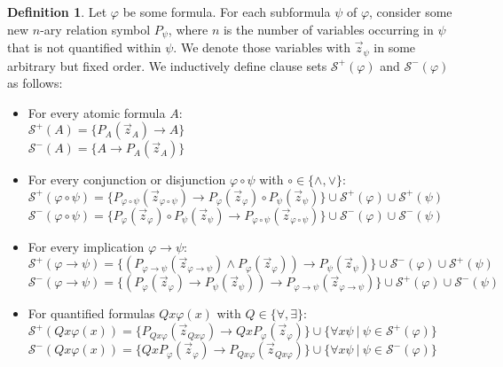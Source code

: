\documentclass[a4paper,12pt]{report}
\theoremstyle{definition}
\theoremstyle{definition}
\theoremstyle{definition}
\theoremstyle{definition}
\theoremstyle{definition}
\newtheorem{definition}[theorem]{Definition}
\theoremstyle{definition}
\theoremstyle{definition}
\begin{document}
	\begin{definition}
		Let $\varphi$ be some formula. For each subformula $\psi$ of $\varphi$, consider some new $n$-ary relation symbol $P_\psi$, where $n$ is the number of variables occurring in $\psi$ that is not quantified within $\psi$. We denote those variables with $\vec z_\psi$ in some arbitrary but fixed order. We inductively define clause sets $\mathcal S^+(\varphi)$ and $\mathcal S^-(\varphi)$ as follows:
		\begin{itemize}
			\item For every atomic formula $A$:\\
			$\mathcal S^+(A) = \{P_A(\vec z_A)\to A\}$\\$\mathcal S^-(A) = \{A\to P_A(\vec z_A)\}$
			\item For every conjunction or disjunction $\varphi\circ\psi$ with $\circ\in\{\wedge,\vee\}$:\\
			$\mathcal S^+(\varphi\circ\psi) = \{P_{\varphi\circ\psi}(\vec z_{\varphi\circ\psi})\to P_{\varphi}(\vec z_\varphi)\circ P_{\psi}(\vec z_\psi)\}\cup \mathcal S^+(\varphi)\cup \mathcal S^+(\psi)$\\$\mathcal S^-(\varphi\circ\psi) =\{P_{\varphi}(\vec z_\varphi)\circ P_{\psi}(\vec z_\psi)\to P_{\varphi\circ\psi}(\vec z_{\varphi\circ\psi})\}\cup \mathcal S^-(\varphi)\cup \mathcal S^-(\psi)$
			\item For every implication $\varphi \to\psi$:\\
			$\mathcal S^+(\varphi\to\psi) = \{(P_{\varphi\to\psi}(\vec z_{\varphi\to\psi})\wedge P_{\varphi}(\vec z_\varphi))\to P_{\psi}(\vec z_\psi)\}\cup \mathcal S^-(\varphi)\cup \mathcal S^+(\psi)$\\$\mathcal S^-(\varphi\to\psi)  = \{(P_{\varphi}(\vec z_\varphi)\to P_{\psi}(\vec z_\psi))\to P_{\varphi\to\psi}(\vec z_{\varphi\to\psi})\}\cup \mathcal S^+(\varphi)\cup \mathcal S^-(\psi)$
			\item For quantified formulas $Qx\varphi(x)$ with $Q\in \{\forall,\exists\}$:\\
			$\mathcal S^+(Qx\varphi(x)) = \{P_{Qx\varphi}(\vec z_{Qx\varphi})\to QxP_{\varphi}(\vec z_{\varphi})\}\cup \{\forall x\psi\:|\:\psi\in\mathcal S^+(\varphi)\}$\\$\mathcal S^-(Qx\varphi(x))  = \{QxP_{\varphi}(\vec z_{\varphi})\to P_{Qx\varphi}(\vec z_{Qx\varphi})\}\cup \{\forall x\psi\:|\:\psi\in\mathcal S^-(\varphi)\}$
		\end{itemize}
	\end{definition}
	
\end{document}
